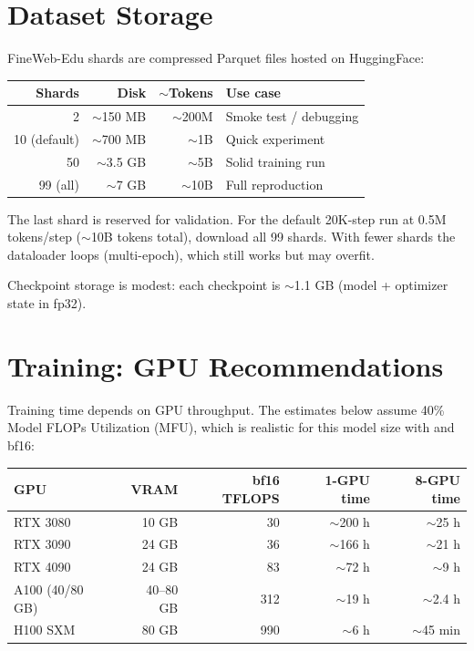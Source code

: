 \section{Dataset Storage}

FineWeb-Edu shards are compressed Parquet files hosted on HuggingFace:

\begin{center}
\begin{tabular}{rrrl}
\toprule
Shards & Disk & $\sim$Tokens & Use case \\
\midrule
2 & $\sim$150 MB & $\sim$200M & Smoke test / debugging \\
10 (default) & $\sim$700 MB & $\sim$1B & Quick experiment \\
50 & $\sim$3.5 GB & $\sim$5B & Solid training run \\
99 (all) & $\sim$7 GB & $\sim$10B & Full reproduction \\
\bottomrule
\end{tabular}
\end{center}

The last shard is reserved for validation.  For the default 20K-step run at
0.5M tokens/step ($\sim$10B tokens total), download all 99 shards.  With fewer
shards the dataloader loops (multi-epoch), which still works but may overfit.

Checkpoint storage is modest: each checkpoint is $\sim$1.1 GB (model + optimizer
state in fp32).


\section{Training: GPU Recommendations}

Training time depends on GPU throughput.  The estimates below assume 40\%
Model FLOPs Utilization (MFU), which is realistic for this model size with
 and bf16:

\begin{center}
\begin{tabular}{lrrrr}
\toprule
GPU & VRAM & bf16 TFLOPS & 1-GPU time & 8-GPU time \\
\midrule
RTX 3080       & 10 GB & 30  & $\sim$200 h  & $\sim$25 h \\
RTX 3090       & 24 GB & 36  & $\sim$166 h  & $\sim$21 h \\
RTX 4090       & 24 GB & 83  & $\sim$72 h   & $\sim$9 h \\
A100 (40/80 GB) & 40--80 GB & 312 & $\sim$19 h   & $\sim$2.4 h \\
H100 SXM       & 80 GB & 990 & $\sim$6 h    & $\sim$45 min \\
\bottomrule
\end{tabular}
\end{center}

